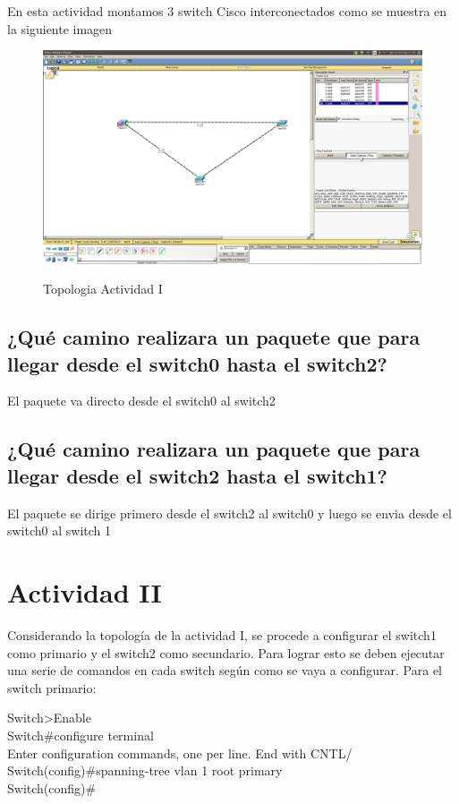 \documentclass[spanish]{udpreport}
\begin{document}
En esta actividad montamos 3 switch Cisco interconectados como se muestra en la siguiente imagen 
\begin{figure}[H]
	\caption{Topologia Actividad I}
	\centering
	\includegraphics[scale=.25]{imagenes/A1.png}
	\label{fig:Figura 2.1}
	\linebreak
\end{figure}

\subsection{¿Qué camino realizara un paquete que para llegar desde el switch0 hasta el switch2?}
El paquete va directo desde el switch0 al switch2
\subsection{¿Qué camino realizara un paquete que para llegar desde el switch2 hasta el switch1?}
El paquete se dirige primero desde el switch2 al switch0 y luego se envia desde el switch0 al switch 1

\section{Actividad II}
Considerando la topología de la actividad I, se procede a configurar el switch1 como primario y el switch2 como secundario. Para lograr esto se deben ejecutar una serie de comandos en cada switch según como se vaya a configurar.
Para el switch primario:
\begin{flushleft}
	Switch>Enable \\
	Switch\#configure terminal \\
	Enter configuration commands, one per line. End with CNTL/ \\
	Switch(config)\#spanning-tree vlan 1 root primary \\
	Switch(config)\# \\
\end{flushleft}
\end{document}

